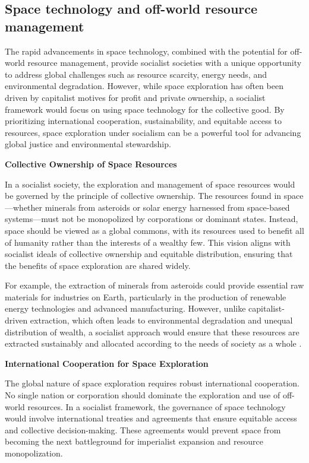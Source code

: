 \begin{refsection}
\subsection{Space technology and off-world resource management}

The rapid advancements in space technology, combined with the potential for off-world resource management, provide socialist societies with a unique opportunity to address global challenges such as resource scarcity, energy needs, and environmental degradation. However, while space exploration has often been driven by capitalist motives for profit and private ownership, a socialist framework would focus on using space technology for the collective good. By prioritizing international cooperation, sustainability, and equitable access to resources, space exploration under socialism can be a powerful tool for advancing global justice and environmental stewardship.

\textbf{Collective Ownership of Space Resources}

In a socialist society, the exploration and management of space resources would be governed by the principle of collective ownership. The resources found in space—whether minerals from asteroids or solar energy harnessed from space-based systems—must not be monopolized by corporations or dominant states. Instead, space should be viewed as a global commons, with its resources used to benefit all of humanity rather than the interests of a wealthy few. This vision aligns with socialist ideals of collective ownership and equitable distribution, ensuring that the benefits of space exploration are shared widely.

For example, the extraction of minerals from asteroids could provide essential raw materials for industries on Earth, particularly in the production of renewable energy technologies and advanced manufacturing. However, unlike capitalist-driven extraction, which often leads to environmental degradation and unequal distribution of wealth, a socialist approach would ensure that these resources are extracted sustainably and allocated according to the needs of society as a whole \cite[pp.~305-310]{klein_space_resources_2021}.

\textbf{International Cooperation for Space Exploration}

The global nature of space exploration requires robust international cooperation. No single nation or corporation should dominate the exploration and use of off-world resources. In a socialist framework, the governance of space technology would involve international treaties and agreements that ensure equitable access and collective decision-making. These agreements would prevent space from becoming the next battleground for imperialist expansion and resource monopolization.


\end{refsection}
